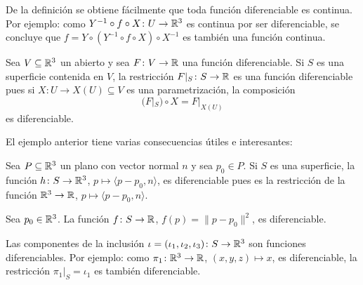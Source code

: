 
De la definición se obtiene fácilmente que toda función diferenciable es
continua. Por ejemplo: como $Y^{-1}\circ f\circ X\colon U\to\mathbb{R}^3$ es continua por ser diferenciable, 
se concluye que $f=Y\circ (Y^{-1}\circ f\circ X)\circ X^{-1}$ es también una
función continua.

\begin{example}
	Sea $V\subseteq\mathbb{R}^3$ un abierto y sea $F\colon V\to\mathbb{R}$ una función
	diferenciable. Si $S$ es una superficie contenida en $V$, la restricción
	$F|_S\colon S\to\mathbb{R}$ es una función diferenciable pues si $X\colon U\to
	X(U)\subseteq V$ es una parametrización, la composición 
	\[
		(F|_S)\circ X=F|_{X(U)}
	\]
	es diferenciable. 
\end{example}

El ejemplo anterior tiene varias consecuencias útiles e interesantes:

%
\begin{example}
	Sea $P\subseteq\mathbb{R}^3$ un plano con vector normal $n$ y sea $p_0\in P$. Si
	$S$ es una superficie, la función $h\colon S\to\mathbb{R}^3$, $p\mapsto\langle
	p-p_0,n\rangle$, es diferenciable pues es la restricción de la función
	$\mathbb{R}^3\to\mathbb{R}$, $p\mapsto \langle p-p_0,n\rangle$.
\end{example}

\begin{example}
	Sea $p_0\in\mathbb{R}^3$.  La función $f\colon S\to\mathbb{R}$, $f(p)=\|p-p_0\|^2$, es
	diferenciable. 
\end{example}

\begin{example}
	Las componentes de la inclusión $\iota=(\iota_1,\iota_2,\iota_3)\colon
	S\to\mathbb{R}^3$ son funciones diferenciables. Por ejemplo: como $\pi_1\colon
	\mathbb{R}^3\to\mathbb{R}$, $(x,y,z)\mapsto x$, es diferenciable, la restricción
	$\pi_1|_S=\iota_1$ es también diferenciable. 
\end{example}

